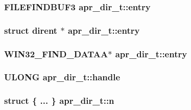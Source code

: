 \subsubsection[{\texorpdfstring{entry}{entry}}]{\setlength{\rightskip}{0pt plus 5cm}F\+I\+L\+E\+F\+I\+N\+D\+B\+U\+F3 apr\+\_\+dir\+\_\+t\+::entry}\hypertarget{structapr__dir__t_a468405126fb08d5880ec676d41c01b36}{}\label{structapr__dir__t_a468405126fb08d5880ec676d41c01b36}
\subsubsection[{\texorpdfstring{entry}{entry}}]{\setlength{\rightskip}{0pt plus 5cm}struct dirent $\ast$ apr\+\_\+dir\+\_\+t\+::entry}\hypertarget{structapr__dir__t_a3ca708a80f894cffc347ee35a5055d8c}{}\label{structapr__dir__t_a3ca708a80f894cffc347ee35a5055d8c}
\subsubsection[{\texorpdfstring{entry}{entry}}]{\setlength{\rightskip}{0pt plus 5cm}W\+I\+N32\+\_\+\+F\+I\+N\+D\+\_\+\+D\+A\+T\+AA$\ast$ apr\+\_\+dir\+\_\+t\+::entry}\hypertarget{structapr__dir__t_a87ba764106b1c690635ea040da277242}{}\label{structapr__dir__t_a87ba764106b1c690635ea040da277242}
\subsubsection[{\texorpdfstring{handle}{handle}}]{\setlength{\rightskip}{0pt plus 5cm}U\+L\+O\+NG apr\+\_\+dir\+\_\+t\+::handle}\hypertarget{structapr__dir__t_acfd3c206f3a37f9755d2fc02c6e025e7}{}\label{structapr__dir__t_acfd3c206f3a37f9755d2fc02c6e025e7}
\subsubsection[{\texorpdfstring{n}{n}}]{\setlength{\rightskip}{0pt plus 5cm}struct \{ ... \}   apr\+\_\+dir\+\_\+t\+::n}\hypertarget{structapr__dir__t_a7b68beaa0b0d3d709b7bd6686edf1dc2}{}\label{structapr__dir__t_a7b68beaa0b0d3d709b7bd6686edf1dc2}

